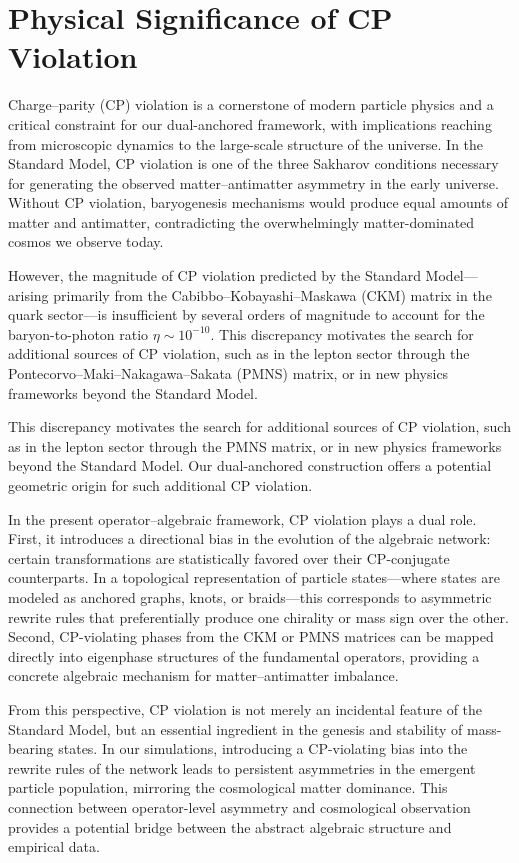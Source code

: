 \documentclass[11pt]{article}
\theoremstyle{plain}
\theoremstyle{definition}
\begin{document}
\section{Physical Significance of CP Violation}

Charge–parity (CP) violation is a cornerstone of modern particle physics and a critical constraint for our dual-anchored framework, with implications reaching from microscopic dynamics to the large-scale structure of the universe. In the Standard Model, CP violation is one of the three Sakharov conditions necessary for generating the observed matter–antimatter asymmetry in the early universe. Without CP violation, baryogenesis mechanisms would produce equal amounts of matter and antimatter, contradicting the overwhelmingly matter-dominated cosmos we observe today.

However, the magnitude of CP violation predicted by the Standard Model---arising primarily from the Cabibbo–Kobayashi–Maskawa (CKM) matrix in the quark sector---is insufficient by several orders of magnitude to account for the baryon-to-photon ratio $\eta \sim 10^{-10}$. This discrepancy motivates the search for additional sources of CP violation, such as in the lepton sector through the Pontecorvo–Maki–Nakagawa–Sakata (PMNS) matrix, or in new physics frameworks beyond the Standard Model.

This discrepancy motivates the search for additional sources of CP violation, such as in the lepton sector through the PMNS matrix, or in new physics frameworks beyond the Standard Model. Our dual-anchored construction offers a potential geometric origin for such additional CP violation.

In the present operator–algebraic framework, CP violation plays a dual role. First, it introduces a directional bias in the evolution of the algebraic network: certain transformations are statistically favored over their CP-conjugate counterparts. In a topological representation of particle states---where states are modeled as anchored graphs, knots, or braids---this corresponds to asymmetric rewrite rules that preferentially produce one chirality or mass sign over the other. Second, CP-violating phases from the CKM or PMNS matrices can be mapped directly into eigenphase structures of the fundamental operators, providing a concrete algebraic mechanism for matter–antimatter imbalance.

From this perspective, CP violation is not merely an incidental feature of the Standard Model, but an essential ingredient in the genesis and stability of mass-bearing states. In our simulations, introducing a CP-violating bias into the rewrite rules of the network leads to persistent asymmetries in the emergent particle population, mirroring the cosmological matter dominance. This connection between operator-level asymmetry and cosmological observation provides a potential bridge between the abstract algebraic structure and empirical data.
\end{document}
